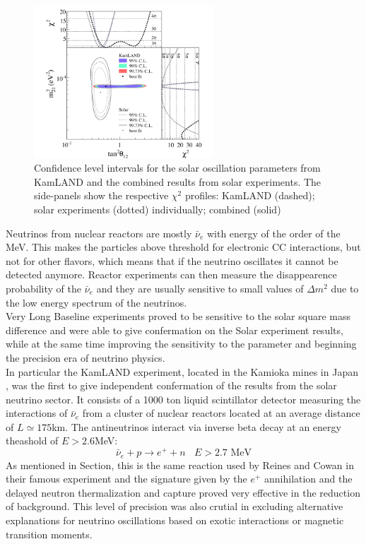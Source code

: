 \documentclass[12pt,a4paper,openright,twoside]{report}
\begin{document}
\begin{figure}
	\centering
	\includegraphics[width=0.6\textwidth]{kamland.png}
	\caption{\label{kamland:fig} Confidence level intervals for the solar oscillation parameters from KamLAND and the combined results from solar experiments. The side-panels show the respective $\chi^2$ profiles: KamLAND (dashed); solar experiments (dotted) individually; combined (solid)}
\end{figure}
Neutrinos from nuclear reactors are mostly $\bar{\nu}_e$ with energy of the order of the MeV. This makes the particles above threshold for electronic CC interactions, but not for other flavors, which means that if the neutrino oscillates it cannot be detected anymore. Reactor experiments can then measure the disappearence probability of the $\bar{\nu}_e$ and they are usually sensitive to small values of $\Delta m^2$ due to the low energy spectrum of the neutrinos. \\
Very Long Baseline experiments proved to be sensitive to the solar square mass difference and were able to give confermation on the Solar experiment results, while at the same time improving the sensitivity to the parameter and beginning the precision era of neutrino physics. \\
In particular the KamLAND experiment, located in the Kamioka mines in Japan , was the first to give independent confermation of the results from the solar neutrino sector. It consists of a 1000 ton liquid scintillator detector measuring the interactions of $\bar{\nu}_e$ from a cluster of nuclear reactors located  at an average distance of $L \simeq 175$km. The antineutrinos interact via inverse beta decay at an energy theashold of $E>2.6$MeV:
\begin{equation}
\bar{\nu}_e + p \rightarrow e^+ +n \ \ \ \ E>\text{2.7 MeV}
\end{equation}
As mentioned in Section, this is the same reaction used by Reines and Cowan in their famous experiment and the signature given by the $e^+$ annihilation and the delayed neutron thermalization and capture proved very effective in the reduction of background. This level of precision was also crutial in excluding alternative explanations for neutrino oscillations based on exotic interactions or magnetic transition moments.
\end{document}
